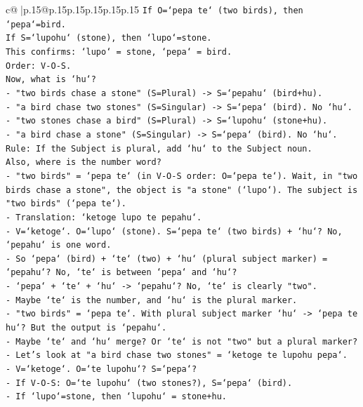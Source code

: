 \documentclass{article}
\begin{document}
{\begin{supertabular}{c@{$\;$}|p{.15\linewidth}@{}p{.15\linewidth}p{.15\linewidth}p{.15\linewidth}p{.15\linewidth}p{.15\linewidth}}
{{{\texttt{If O=`pepa te` (two birds), then `pepa`=bird.} \\
\texttt{If S=`lupohu` (stone), then `lupo`=stone.} \\
\texttt{This confirms: `lupo` = stone, `pepa` = bird.} \\
\texttt{Order: V{-}O{-}S.} \\
\texttt{Now, what is `hu`?} \\
\texttt{{-} "two birds chase a stone" (S=Plural) {-}> S=`pepahu` (bird+hu).} \\
\texttt{{-} "a bird chase two stones" (S=Singular) {-}> S=`pepa` (bird). No `hu`.} \\
\texttt{{-} "two stones chase a bird" (S=Plural) {-}> S=`lupohu` (stone+hu).} \\
\texttt{{-} "a bird chase a stone" (S=Singular) {-}> S=`pepa` (bird). No `hu`.} \\
\texttt{Rule: If the Subject is plural, add `hu` to the Subject noun.} \\
\texttt{Also, where is the number word?} \\
\texttt{{-} "two birds" = `pepa te` (in V{-}O{-}S order: O=`pepa te`). Wait, in "two birds chase a stone", the object is "a stone" (`lupo`). The subject is "two birds" (`pepa te`).} \\
\texttt{{-} Translation: `ketoge lupo te pepahu`.} \\
\texttt{{-} V=`ketoge`. O=`lupo` (stone). S=`pepa te` (two birds) + `hu`? No, `pepahu` is one word.} \\
\texttt{{-} So `pepa` (bird) + `te` (two) + `hu` (plural subject marker) = `pepahu`? No, `te` is between `pepa` and `hu`?} \\
\texttt{{-} `pepa` + `te` + `hu` {-}> `pepahu`? No, `te` is clearly "two".} \\
\texttt{{-} Maybe `te` is the number, and `hu` is the plural marker.} \\
\texttt{{-} "two birds" = `pepa te`. With plural subject marker `hu` {-}> `pepa te hu`? But the output is `pepahu`.} \\
\texttt{{-} Maybe `te` and `hu` merge? Or `te` is not "two" but a plural marker?} \\
\texttt{{-} Let's look at "a bird chase two stones" = `ketoge te lupohu pepa`.} \\
\texttt{{-} V=`ketoge`. O=`te lupohu`? S=`pepa`?} \\
\texttt{{-} If V{-}O{-}S: O=`te lupohu` (two stones?), S=`pepa` (bird).} \\
\texttt{{-} If `lupo`=stone, then `lupohu` = stone+hu.} \\
}}}
\end{supertabular}}
\end{document}
